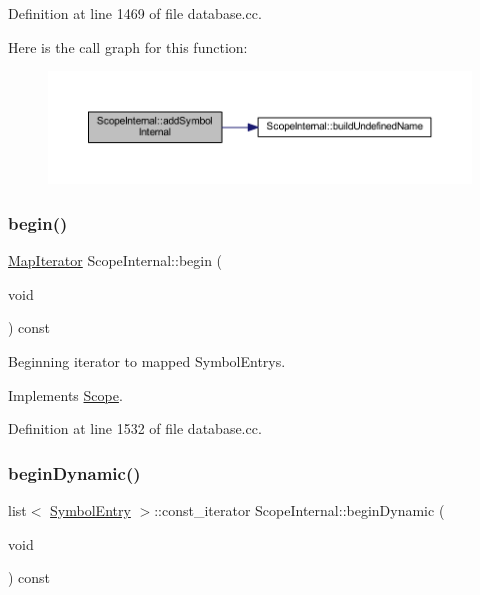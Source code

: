 Definition at line 1469 of file database.\+cc.

Here is the call graph for this function\+:
\nopagebreak
\begin{figure}[H]
\begin{center}
\leavevmode
\includegraphics[width=350pt]{class_scope_internal_af252bcb614abeea3af1750442087304a_cgraph}
\end{center}
\end{figure}
\mbox{\label{class_scope_internal_ace6700a82166765cf943bb95f1efeb10}} 
\subsubsection{\texorpdfstring{begin()}{begin()}}
{\footnotesize\ttfamily \mbox{\hyperlink{class_map_iterator}{Map\+Iterator}} Scope\+Internal\+::begin (\begin{DoxyParamCaption}\item[{void}]{ }\end{DoxyParamCaption}) const\hspace{0.3cm}{\ttfamily [virtual]}}



Beginning iterator to mapped Symbol\+Entrys. 



Implements \mbox{\hyperlink{class_scope_a054e7b7c470035be94e1e4229ff188d4}{Scope}}.



Definition at line 1532 of file database.\+cc.

\mbox{\label{class_scope_internal_a3e1111265c90754ecafd2331f9c7a684}} 
\subsubsection{\texorpdfstring{beginDynamic()}{beginDynamic()}\hspace{0.1cm}{\footnotesize\ttfamily [1/2]}}
{\footnotesize\ttfamily list$<$ \mbox{\hyperlink{class_symbol_entry}{Symbol\+Entry}} $>$\+::const\+\_\+iterator Scope\+Internal\+::begin\+Dynamic (\begin{DoxyParamCaption}\item[{void}]{ }\end{DoxyParamCaption}) const\hspace{0.3cm}{\ttfamily [virtual]}}



